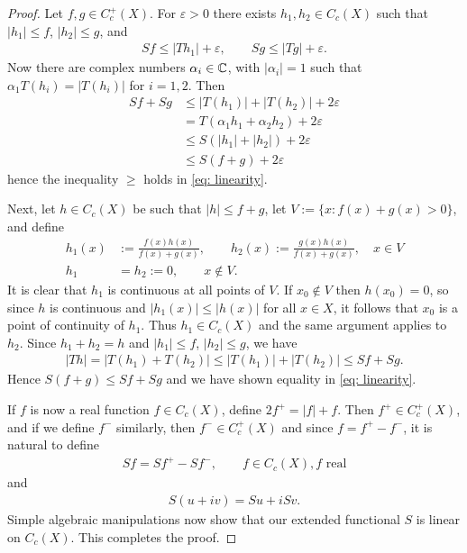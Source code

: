 \begin{proof}
Let $f,g\in C_{c}^{+}(X)$. For $\varepsilon > 0$ there exists $h_{1},h_{2}\in C_{c}(X)$ such that $|h_{1}|\le f$, $|h_{2}|\le g$, and
\begin{align*}
	Sf \le |Th_{1}| + \varepsilon, \qquad Sg \le |Tg| + \varepsilon.
\end{align*}
Now there are complex numbers $\alpha_{i}\in \mathbb{C}$, with $|\alpha_{i}|=1$ such that $\alpha_{1}T(h_{i})=|T(h_{i})|$ for $i=1,2$.
Then
\begin{align*}
	Sf+Sg &\le |T(h_{1})| + |T(h_{2})| + 2\varepsilon \\
	&= T(\alpha_{1}h_{1} + \alpha_{2}h_{2}) + 2\varepsilon \\
	&\le S(|h_{1}| + |h_{2}|) + 2\varepsilon \\
	&\le S(f+g) + 2\varepsilon
\end{align*}
hence the inequality $\ge$ holds in \eqref{eq: linearity}.

Next, let $h\in C_{c}(X)$ be such that $|h| \le f + g$, let $V:=\{ x: f(x) + g(x) > 0 \}$, and define
\begin{align*}
	h_{1}(x)&:= \frac{f(x)h(x)}{f(x)+g(x)}, \qquad h_{2}(x):=\frac{g(x)h(x)}{f(x)+g(x)}, \quad x\in V \\
	h_{1}&=h_{2}:=0, \qquad x\not\in V.
\end{align*}
It is clear that $h_{1}$ is continuous at all points of $V$. If $x_{0}\not\in V$ then $h(x_{0})=0$, so since $h$ is continuous and $|h_{1}(x)| \le |h(x)|$ for all $x\in X$, it follows that $x_{0}$ is a point of continuity of $h_{1}$. Thus $h_{1}\in C_{c}(X)$ and the same argument applies to $h_{2}$.
Since $h_{1}+h_{2}=h$ and $|h_{1}| \le f$, $|h_{2}| \le g$, we have
\begin{align*}
	|Th| = |T(h_{1}) + T(h_{2})| \le |T(h_{1})| + |T(h_{2})| \le Sf + Sg.
\end{align*}
Hence $S(f+g) \le Sf + Sg$ and we have shown equality in \eqref{eq: linearity}.

If $f$ is now a real function $f\in C_{c}(X)$, define $2f^{+}=|f|+f$. Then $f^{+}\in C_{c}^{+}(X)$, and if we define $f^{-}$ similarly, then $f^{-}\in C_{c}^{+}(X)$ and since $f=f^{+}-f^{-}$, it is natural to define
\begin{align*}
	Sf=Sf^{+} - Sf^{-}, \qquad f\in C_{c}(X), f \text{ real}
\end{align*}
and
\begin{align*}
	S(u+iv)=Su+ iSv.
\end{align*}
Simple algebraic manipulations now show that our extended functional $S$ is linear on $C_{c}(X)$. This completes the proof.
\end{proof}








